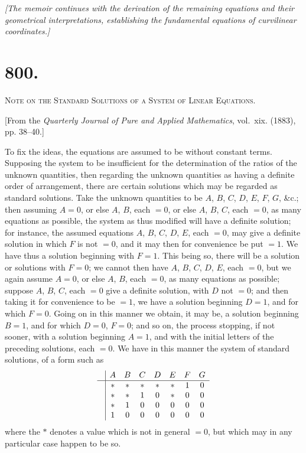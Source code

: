 \documentclass[11pt,a4paper]{book}
\begin{document}
\vspace{0.5cm}
\noindent\textit{[The memoir continues with the derivation of the remaining equations and their geometrical interpretations, establishing the fundamental equations of curvilinear coordinates.]}
\vspace{0.5cm}



\newpage
\section*{800.}
\begin{center}
{\large\scshape Note on the Standard Solutions of a System of Linear Equations.}
\end{center}

\begin{flushright}
\small[From the \textit{Quarterly Journal of Pure and Applied Mathematics}, vol.~xix. (1883),\\
pp. 38--40.]
\end{flushright}

To fix the ideas, the equations are assumed to be without constant terms. Supposing the system to be insufficient for the determination of the ratios of the unknown quantities, then regarding the unknown quantities as having a definite order of arrangement, there are certain solutions which may be regarded as standard solutions. Take the unknown quantities to be $A$, $B$, $C$, $D$, $E$, $F$, $G$, \&c.; then assuming $A=0$, or else $A$, $B$, each $=0$, or else $A$, $B$, $C$, each $=0$, as many equations as possible, the system as thus modified will have a definite solution; for instance, the assumed equations $A$, $B$, $C$, $D$, $E$, each $=0$, may give a definite solution in which $F$ is not $=0$, and it may then for convenience be put $=1$. We have thus a solution beginning with $F=1$. This being so, there will be a solution or solutions with $F=0$; we cannot then have $A$, $B$, $C$, $D$, $E$, each $=0$, but we again assume $A=0$, or else $A$, $B$, each $=0$, as many equations as possible; suppose $A$, $B$, $C$, each $=0$ give a definite solution, with $D$ not $=0$; and then taking it for convenience to be $=1$, we have a solution beginning $D=1$, and for which $F=0$. Going on in this manner we obtain, it may be, a solution beginning $B=1$, and for which $D=0$, $F=0$; and so on, the process stopping, if not sooner, with a solution beginning $A=1$, and with the initial letters of the preceding solutions, each $=0$. We have in this manner the system of standard solutions, of a form such as
\[
\begin{array}{c|ccccccc}
& A & B & C & D & E & F & G \\ \hline
& * & * & * & * & * & 1 & 0 \\
& * & * & 1 & 0 & * & 0 & 0 \\
& * & 1 & 0 & 0 & 0 & 0 & 0 \\
& 1 & 0 & 0 & 0 & 0 & 0 & 0
\end{array}
\]
where the $*$ denotes a value which is not in general $=0$, but which may in any particular case happen to be so.
\end{document}
